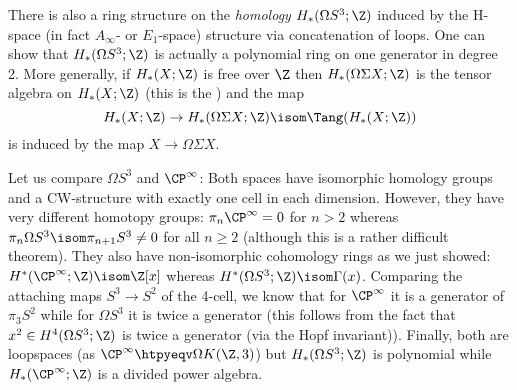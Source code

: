 \documentclass[wip, topology]{bsteffan-lecturenotes}
\begin{document}
\begin{remark}
	There is also a ring structure on the \emph{homology} $H_*(\Omega S^3; \Z)$ induced by the H-space (in fact $A_\infty$- or $E_1$-space) structure via concatenation of loops.
	One can show that $H_*(\Omega S^3; \Z)$ is actually a polynomial ring on one generator in degree 2.
	More generally, if $H_*(X; \Z)$ is free over $\Z$ then $H_*(\Omega \Sigma X; \Z)$ is the tensor algebra on $H_*(X; \Z)$ (this is the ) and the map
	\begin{equation*}
		H_*(X; \Z) \to H_*(\Omega \Sigma X; \Z) \isom \Tang(H_*(X; \Z))
	\end{equation*} 
	is induced by the map $X \to \Omega \Sigma X$.
\end{remark}
\begin{remark}
	Let us compare $\Omega S^3$ and $\CP^\infty$:
	Both spaces have isomorphic homology groups and a CW-structure with exactly one cell in each dimension.
	However, they have very different homotopy groups: $\pi_n \CP^\infty = 0$ for $n > 2$ whereas $\pi_n \Omega S^3 \isom \pi_{n + 1} S^3 \neq 0$ for all $n \geq 2$ (although this is a rather difficult theorem).
	They also have non-isomorphic cohomology rings as we just showed: $H^*(\CP^\infty; \Z) \isom \Z[x]$ whereas $H^*(\Omega S^3; \Z) \isom \Gamma(x)$.
	Comparing the attaching maps $S^3 \to S^2$ of the 4-cell, we know that for $\CP^\infty$ it is a generator of $\pi_3 S^2$ while for $\Omega S^3$ it is twice a generator (this follows from the fact that $x^2 \in H^4(\Omega S^3; \Z)$ is twice a generator (via the Hopf invariant)).
	Finally, both are loopspaces (as $\CP^\infty \htpyeqv \Omega K(\Z, 3)$) but $H_*(\Omega S^3; \Z)$ is polynomial while $H_*(\CP^\infty; \Z)$ is a divided power algebra.
\end{remark}
\end{document}

